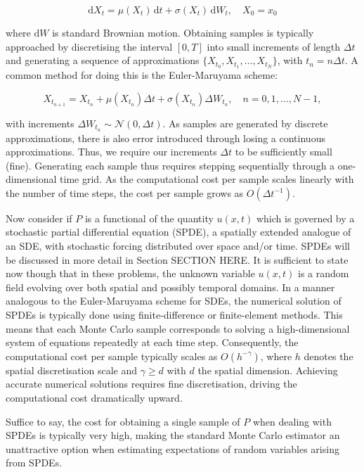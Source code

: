 \begin{equation*}
    \mathrm{d}X_t = \mu(X_t)\,\mathrm{d}t+\sigma(X_t)\,\mathrm{d}W_t,\quad X_0=x_0
\end{equation*}

where $\mathrm{d}W$ is standard Brownian motion. Obtaining samples is typically 
approached by discretising the interval $[0,T]$ into 
small increments of length $\Delta t$ and generating a sequence of approximations 
$\{X_{t_0}, X_{t_1}, \dots, X_{t_N}\}$, with $t_n = n \Delta t$. A common 
method for doing this is the Euler-Maruyama scheme:

\begin{equation}\label{eq:euler_maruyama}
    X_{t_{n+1}}=X_{t_n}+\mu(X_{t_n})\Delta t+\sigma(X_{t_n})\Delta W_{t_n},\quad n=0,1,\dots,N-1,
\end{equation}

with increments $\Delta W_{t_n} \sim \mathcal{N}(0, \Delta t)$. As samples are generated 
by discrete approximations, there is also error introduced through losing a continuous 
approximations. Thus, we require our increments $\Delta t$ to be sufficiently small (fine).
Generating each sample thus requires stepping sequentially through a one-dimensional
time grid.
As the computational cost per sample scales linearly with the number of time steps, 
the cost per sample grows as $O(\Delta t^{-1})$.

Now consider if $P$ is a functional of the quantity $u(x,t)$ which is 
governed by a stochastic partial differential equation (SPDE), a spatially extended
analogue of an SDE, with stochastic forcing distributed over space and/or time. 
SPDEs will be discussed in more detail in Section SECTION HERE.
It is sufficient to state now though that in these problems, 
the unknown variable $u(x,t)$ is a random field
evolving over both spatial and possibly temporal domains. In a manner analogous 
to the Euler-Maruyama scheme for SDEs, the numerical solution of SPDEs
is typically done using finite-difference or finite-element methods. This means 
that each Monte Carlo sample corresponds to solving a high-dimensional system of
equations repeatedly at each time step. Consequently, the computational 
cost per sample typically scales as $O(h^{-\gamma})$, where $h$ denotes the 
spatial discretisation scale and $\gamma \ge d$ with $d$ the 
spatial dimension. Achieving accurate numerical solutions requires fine discretisation,
driving the computational cost dramatically upward.

Suffice to say, the cost for obtaining a single sample of $P$ when dealing with 
SPDEs is typically very high, making the standard Monte Carlo estimator an 
unattractive option when estimating expectations of random variables arising from SPDEs.

